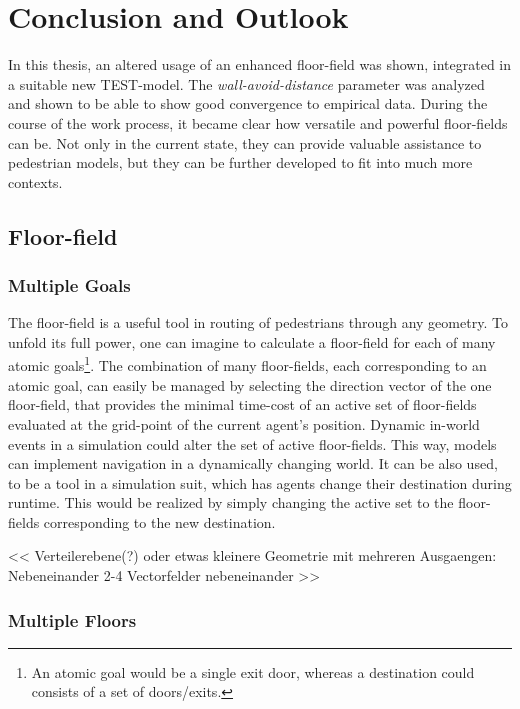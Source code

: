 \section{Conclusion and Outlook}

In this thesis, an altered usage of an enhanced floor-field was shown, integrated in a suitable new TEST-model. The \emph{wall-avoid-distance} parameter was analyzed and shown to be able to show good convergence to empirical data. During the course of the work process, it became clear how versatile and powerful floor-fields can be. Not only in the current state, they can provide valuable assistance to pedestrian models, but they can be further developed to fit into much more contexts.

\subsection{Floor-field}

\subsubsection{Multiple Goals }

The floor-field is a useful tool in routing of pedestrians through any geometry. To unfold its full power, one can imagine to calculate a floor-field for each of many atomic goals\footnote{An atomic goal would be a single exit door, whereas a destination could consists of a set of doors/exits.}. The combination of many floor-fields, each corresponding to an atomic goal, can easily be managed by selecting the direction vector of the one floor-field, that provides the minimal time-cost of an active set of floor-fields evaluated at the grid-point of the current agent's position. Dynamic in-world events in a simulation could alter the set of active floor-fields. This way, models can implement navigation in a dynamically changing world. It can be also used, to be a tool in a simulation suit, which has agents change their destination during runtime. This would be realized by simply changing the active set to the floor-fields corresponding to the new destination.

<< Verteilerebene(?) oder etwas kleinere Geometrie mit mehreren Ausgaengen: Nebeneinander 2-4 Vectorfelder nebeneinander >>

\subsubsection{Multiple Floors}

